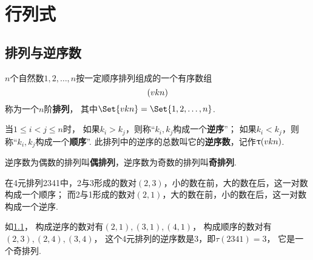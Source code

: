 \chapter{行列式}
\section{排列与逆序数}
\begin{definition}
\(n\)个自然数\(1,2,\dotsc,n\)按一定顺序排列组成的一个有序数组\[
	(v{k}{n})
\]称为一个\(n\)阶\textbf{排列}，
其中\(\Set{\v{k}{n}} = \Set{1,2,\dotsc,n}\).

当\(1 \leqslant i<j \leqslant n\)时，
如果\(k_i>k_j\)，则称“\(k_i,k_j\)构成一个\textbf{逆序}”；
如果\(k_i<k_j\)，则称“\(k_i,k_j\)构成一个\textbf{顺序}”.
此排列中的逆序的总数叫它的\textbf{逆序数}，记作\(\uptau(v{k}{n})\).

逆序数为偶数的排列叫\textbf{偶排列}，逆序数为奇数的排列叫\textbf{奇排列}.
\end{definition}

\begin{example}
在4元排列2341中，2与3形成的数对\((2,3)\)，小的数在前，大的数在后，这一对数构成一个顺序；
而2与1形成的数对\((2,1)\)，大的数在前，小的数在后，这一对数构成一个逆序.

\begin{figure}[ht]
	\centering
	\caption{}
	\label{figure:行列式.4元排列2341的所有数对}
\end{figure}

如\cref{figure:行列式.4元排列2341的所有数对}，
构成逆序的数对有\((2,1),(3,1),(4,1)\)，
构成顺序的数对有\((2,3),(2,4),(3,4)\)，
这个4元排列的逆序数是3，即\(\tau(2341)=3\)，
它是一个奇排列.
\end{example}

